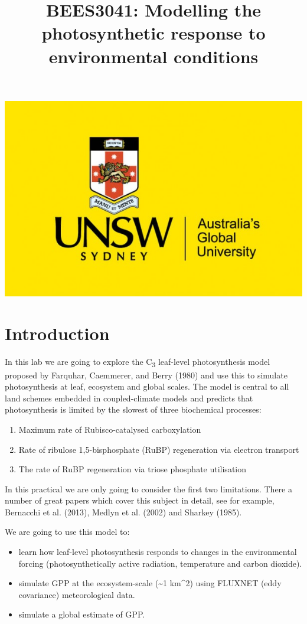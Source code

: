 \documentclass[]{article}
\title{BEES3041: Modelling the photosynthetic response to environmental
conditions}
\author{}
\date{}
\providecommand{\tightlist}{%
  \setlength{\itemsep}{0pt}\setlength{\parskip}{0pt}}
\begin{document}
\maketitle

\includegraphics[width=0.3\linewidth]{data/logo}

\hypertarget{introduction}{%
\section{Introduction}\label{introduction}}

In this lab we are going to explore the C\textsubscript{3} leaf-level
photosynthesis model proposed by Farquhar, Caemmerer, and Berry (1980)
and use this to simulate photosynthesis at leaf, ecosystem and global
scales. The model is central to all land schemes embedded in
coupled-climate models and predicts that photosynthesis is limited by
the slowest of three biochemical processes:

\begin{enumerate}
\def\labelenumi{\arabic{enumi}.}
\tightlist
\item
  Maximum rate of Rubisco-catalysed carboxylation
\item
  Rate of ribulose 1,5-bisphosphate (RuBP) regeneration via electron
  transport
\item
  The rate of RuBP regeneration via triose phosphate utilisation
\end{enumerate}

In this practical we are only going to consider the first two
limitations. There a number of great papers which cover this subject in
detail, see for example, Bernacchi et al. (2013), Medlyn et al. (2002)
and Sharkey (1985).

We are going to use this model to:

\begin{itemize}
\tightlist
\item
  learn how leaf-level photosynthesis responds to changes in the
  environmental forcing (photosynthetically active radiation,
  temperature and carbon dioxide).
\item
  simulate GPP at the ecosystem-scale (\textasciitilde{}1 km\^{}2) using
  FLUXNET (eddy covariance) meteorological data.
\item
  simulate a global estimate of GPP.
\end{itemize}
\end{document}
